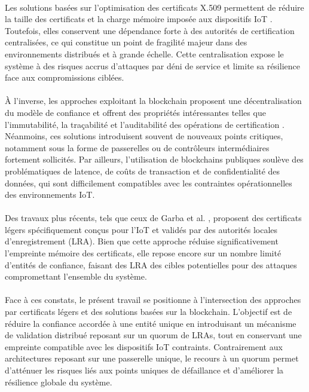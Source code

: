 \documentclass[12pt]{report}
\begin{document}
\begin{itemize}
\begin{itemize}
\newpage

\paragraph{}Les solutions basées sur l’optimisation des certificats X.509 permettent de réduire la taille des certificats et la charge mémoire imposée aux dispositifs IoT \cite{forsby2018lightweight,hoglund2020pki4iot}. Toutefois, elles conservent une dépendance forte à des autorités de certification centralisées, ce qui constitue un point de fragilité majeur dans des environnements distribués et à grande échelle. Cette centralisation expose le système à des risques accrus d’attaques par déni de service et limite sa résilience face aux compromissions ciblées.

\paragraph{}À l’inverse, les approches exploitant la blockchain proposent une décentralisation du modèle de confiance et offrent des propriétés intéressantes telles que l’immutabilité, la traçabilité et l’auditabilité des opérations de certification \cite{dorri2017lsb,champagne2021replacing}. Néanmoins, ces solutions introduisent souvent de nouveaux points critiques, notamment sous la forme de passerelles ou de contrôleurs intermédiaires fortement sollicités. Par ailleurs, l’utilisation de blockchains publiques soulève des problématiques de latence, de coûts de transaction et de confidentialité des données, qui sont difficilement compatibles avec les contraintes opérationnelles des environnements IoT.

\paragraph{}Des travaux plus récents, tels que ceux de Garba et al. \cite{garba2023lightcert4iots}, proposent des certificats légers spécifiquement conçus pour l’IoT et validés par des autorités locales d’enregistrement (LRA). Bien que cette approche réduise significativement l’empreinte mémoire des certificats, elle repose encore sur un nombre limité d’entités de confiance, faisant des LRA des cibles potentielles pour des attaques compromettant l’ensemble du système.

\paragraph{}Face à ces constats, le présent travail se positionne à l’intersection des approches par certificats légers et des solutions basées sur la blockchain. L’objectif est de réduire la confiance accordée à une entité unique en introduisant un mécanisme de validation distribué reposant sur un quorum de LRAs, tout en conservant une empreinte compatible avec les dispositifs IoT contraints. Contrairement aux architectures reposant sur une passerelle unique, le recours à un quorum permet d’atténuer les risques liés aux points uniques de défaillance et d’améliorer la résilience globale du système.


\end{itemize}
\end{itemize}
\end{document}
